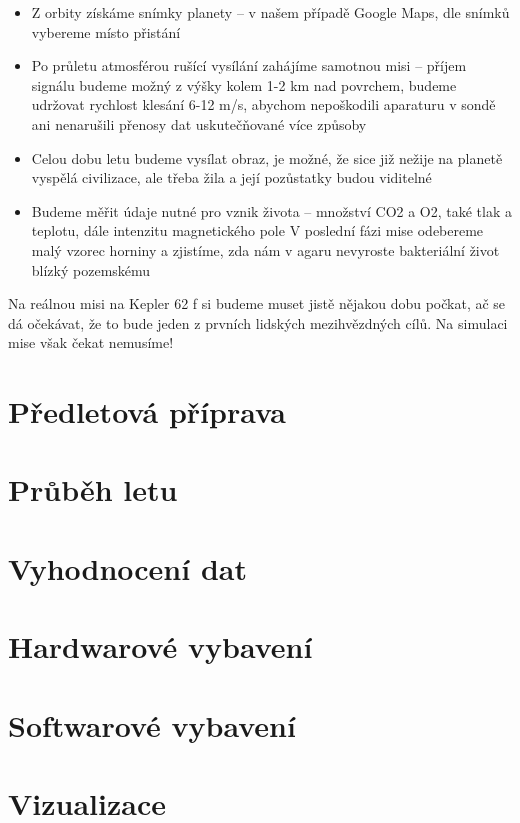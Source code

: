 \documentclass{article}
\begin{document}
\begin{itemize}
\item Z orbity získáme snímky planety – v našem případě Google Maps, dle snímků vybereme místo přistání

\item Po průletu atmosférou rušící vysílání zahájíme samotnou misi – příjem signálu budeme možný z výšky kolem 1-2 km nad povrchem, budeme udržovat rychlost klesání 6-12 m/s, abychom nepoškodili aparaturu v sondě ani nenarušili přenosy dat uskutečňované více způsoby
\item Celou dobu letu budeme vysílat obraz, je možné, že sice již nežije na planetě vyspělá civilizace, ale třeba žila a její pozůstatky budou viditelné
\item Budeme měřit údaje nutné pro vznik života – množství CO2 a O2, také tlak a teplotu, dále intenzitu magnetického pole
V poslední fázi mise odebereme malý vzorec horniny a zjistíme, zda nám v agaru nevyroste bakteriální život blízký pozemskému
\end{itemize}
\item Na reálnou misi na Kepler 62 f si budeme muset jistě nějakou dobu počkat, ač se dá očekávat, že to bude jeden z prvních lidských mezihvězdných cílů. Na simulaci mise však čekat nemusíme!
\section{Předletová příprava}

\section{Průběh letu}

\section{Vyhodnocení dat}

\section{Hardwarové vybavení}

\section{Softwarové vybavení}

\section{Vizualizace}
\end{document}
